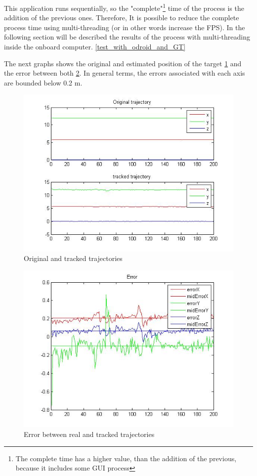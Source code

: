 	{
	\label{Reference_fps_table}
	This application runs sequentially, so the "complete"\footnote{The complete time has a higher value, than the addition of the previous, because it includes some GUI process} time of the process is the addition of the previous ones. Therefore, It is possible to reduce the complete process time using multi-threading (or in other words increase the FPS). In the following section will be described the results of the process with multi-threading inside the onboard computer. \ref{test_with_odroid_and_GT}
	}
	
	The next graphs shows the original and estimated position of the target \ref{fig:trajectories_PC} and the error between both \ref{fig:errors_PC}. In general terms, the errors associated with each axis are bounded below 0.2 m.
	
	\begin{figure}[hp]
		\centering
		\includegraphics[width=0.75\linewidth]{../Images/c4/trajs}
		\caption{Original and tracked trajectories}
		\label{fig:trajectories_PC}
	\end{figure}
	
	\begin{figure}[hp]
		\centering
		\includegraphics[width=0.5\linewidth]{../Images/c4/errors}
		\caption{Error between real and tracked trajectories}
		\label{fig:errors_PC}
	\end{figure}
	
